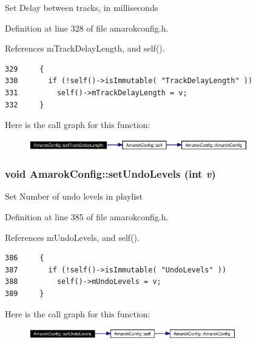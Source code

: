 Set Delay between tracks, in milliseconds 

Definition at line 328 of file amarokconfig.h.

References m\-Track\-Delay\-Length, and self().



\footnotesize\begin{verbatim}329     {
330       if (!self()->isImmutable( "TrackDelayLength" ))
331         self()->mTrackDelayLength = v;
332     }
\end{verbatim}\normalsize 


Here is the call graph for this function:\begin{figure}[H]
\begin{center}
\leavevmode
\includegraphics[width=270pt]{classAmarokConfig_AmarokConfige33_cgraph}
\end{center}
\end{figure}
\subsubsection{\setlength{\rightskip}{0pt plus 5cm}void Amarok\-Config::set\-Undo\-Levels (int {\em v})\hspace{0.3cm}{\tt  [inline, static]}}\label{classAmarokConfig_AmarokConfige39}


Set Number of undo levels in playlist 

Definition at line 385 of file amarokconfig.h.

References m\-Undo\-Levels, and self().



\footnotesize\begin{verbatim}386     {
387       if (!self()->isImmutable( "UndoLevels" ))
388         self()->mUndoLevels = v;
389     }
\end{verbatim}\normalsize 


Here is the call graph for this function:\begin{figure}[H]
\begin{center}
\leavevmode
\includegraphics[width=256pt]{classAmarokConfig_AmarokConfige39_cgraph}
\end{center}
\end{figure}
